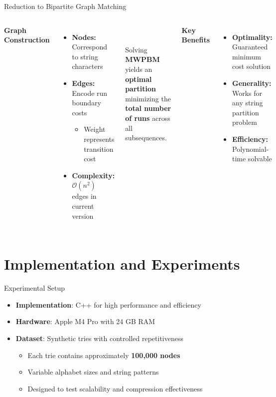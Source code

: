 \documentclass[aspectratio=169]{beamer}
\begin{document}
\begin{frame}{Reduction to Bipartite Graph Matching}
	\begin{columns}[c]
		\textcolor{oiRed}{\textbf{Graph Construction}}
		\begin{itemize}
			\item \textbf{Nodes:} Correspond to string characters
			\item \textbf{Edges:} Encode run boundary costs
			      \begin{itemize}
				      \item Weight represents transition cost
			      \end{itemize}
			\item \textbf{Complexity:} $\mathcal{O}(n^2)$ edges in current version
		\end{itemize}
		\begin{block}{\textcolor{white}{\textbf{Optimization Objective}}}
			\centering
			Solving \textbf{MWPBM} yields an \textcolor{oiBlue}{\textbf{optimal partition}} minimizing the \textcolor{oiBlue}{\textbf{total number of runs}} across all subsequences.
		\end{block}

		\vspace{0.3cm}
		\textcolor{oiGreen}{\textbf{Key Benefits}}
		\begin{itemize}
			\item \textbf{Optimality:} Guaranteed minimum cost solution
			\item \textbf{Generality:} Works for any string partition problem
			\item \textbf{Efficiency:} Polynomial-time solvable
		\end{itemize}
	\end{columns}
\end{frame}


\section{Implementation and Experiments}
\begin{frame}{Experimental Setup}
	\begin{itemize}
		\item \textcolor{oiBlue}{\textbf{Implementation}:} C++ for high performance and efficiency
		\item \textcolor{oiGreen}{\textbf{Hardware}:} Apple M4 Pro with 24 GB RAM
		\item \textcolor{oiRed}{\textbf{Dataset}:} Synthetic tries with controlled repetitiveness
		      \begin{itemize}
			      \item Each trie contains approximately \textbf{100,000 nodes}
			      \item Variable alphabet sizes and string patterns
			      \item Designed to test scalability and compression effectiveness
		      \end{itemize}
	\end{itemize}
\end{frame}
\end{document}
